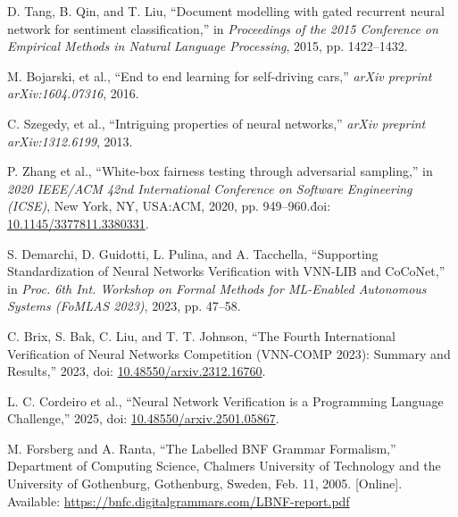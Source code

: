 \documentclass[12pt,a4paper]{report}
\begin{document}
\begin{thebibliography}{9} 

D. Tang, B. Qin, and T. Liu, ``Document modelling with gated recurrent neural network for sentiment classification,'' in \emph{Proceedings of the 2015 Conference on Empirical Methods in Natural Language Processing}, 2015, pp. 1422--1432.

M. Bojarski, et al., ``End to end learning for self-driving cars,'' \emph{arXiv preprint arXiv:1604.07316}, 2016.

C. Szegedy, et al., ``Intriguing properties of neural networks,'' \emph{arXiv preprint arXiv:1312.6199}, 2013.

P. Zhang et al., ``White-box fairness testing through adversarial sampling,'' in \emph{2020 IEEE/ACM 42nd International Conference on Software Engineering (ICSE)}, New York, NY, USA:\@ ACM, 2020, pp. 949--960.\'doi: \href{https://doi.org/10.1145/3377811.3380331}{10.1145/3377811.3380331}.

S. Demarchi, D. Guidotti, L. Pulina, and A. Tacchella, ``Supporting Standardization of Neural Networks Verification with VNN-LIB and CoCoNet,'' in \emph{Proc. 6th Int. Workshop on Formal Methods for ML-Enabled Autonomous Systems (FoMLAS 2023)}, 2023, pp. 47--58.

C. Brix, S. Bak, C. Liu, and T. T. Johnson, ``The Fourth International Verification of Neural Networks Competition (VNN-COMP 2023): Summary and Results,'' 2023, doi: \href{https://doi.org/10.48550/arxiv.2312.16760}{10.48550/arxiv.2312.16760}.

L. C. Cordeiro et al., ``Neural Network Verification is a Programming Language Challenge,'' 2025, doi: \href{https://doi.org/10.48550/arxiv.2501.05867}{10.48550/arxiv.2501.05867}.

M. Forsberg and A. Ranta, ``The Labelled BNF Grammar Formalism,'' Department of Computing Science, Chalmers University of Technology and the University of Gothenburg, Gothenburg, Sweden, Feb. 11, 2005. [Online]. Available: \url{https://bnfc.digitalgrammars.com/LBNF-report.pdf}

\end{thebibliography}
\end{document}
